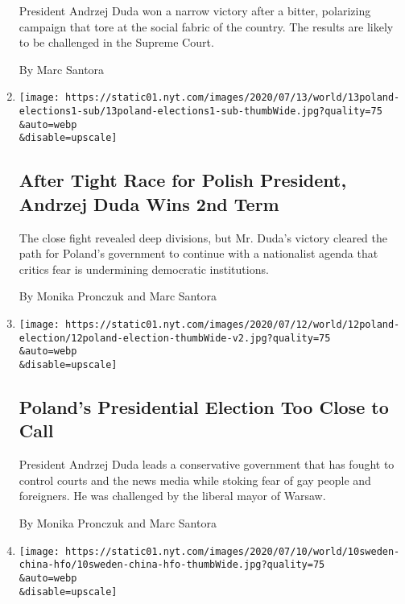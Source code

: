 \begin{enumerate}
  President Andrzej Duda won a narrow victory after a bitter, polarizing
  campaign that tore at the social fabric of the country. The results
  are likely to be challenged in the Supreme Court.

  By Marc Santora
\item
  \href{/2020/07/13/world/europe/poland-president-elections-Andrzej-Duda.html}{}

  \texttt{[image: https://static01.nyt.com/images/2020/07/13/world/13poland-elections1-sub/13poland-elections1-sub-thumbWide.jpg?quality=75\\\&auto=webp\\\&disable=upscale]}

  \hypertarget{after-tight-race-for-polish-president-andrzej-duda-wins-2nd-term}{%
  \subsection{After Tight Race for Polish President, Andrzej Duda Wins
  2nd
  Term}\label{after-tight-race-for-polish-president-andrzej-duda-wins-2nd-term}}

  The close fight revealed deep divisions, but Mr. Duda's victory
  cleared the path for Poland's government to continue with a
  nationalist agenda that critics fear is undermining democratic
  institutions.

  By Monika Pronczuk and Marc Santora
\item
  \href{/2020/07/12/world/europe/poland-election-Duda-Trzaskowski.html}{}

  \texttt{[image: https://static01.nyt.com/images/2020/07/12/world/12poland-election/12poland-election-thumbWide-v2.jpg?quality=75\\\&auto=webp\\\&disable=upscale]}

  \hypertarget{polands-presidential-election-too-close-to-call}{%
  \subsection{Poland's Presidential Election Too Close to
  Call}\label{polands-presidential-election-too-close-to-call}}

  President Andrzej Duda leads a conservative government that has fought
  to control courts and the news media while stoking fear of gay people
  and foreigners. He was challenged by the liberal mayor of Warsaw.

  By Monika Pronczuk and Marc Santora
\item
  \href{/2020/07/10/world/europe/sweden-ambassador-china.html}{}

  \texttt{[image: https://static01.nyt.com/images/2020/07/10/world/10sweden-china-hfo/10sweden-china-hfo-thumbWide.jpg?quality=75\\\&auto=webp\\\&disable=upscale]}


\end{enumerate}
